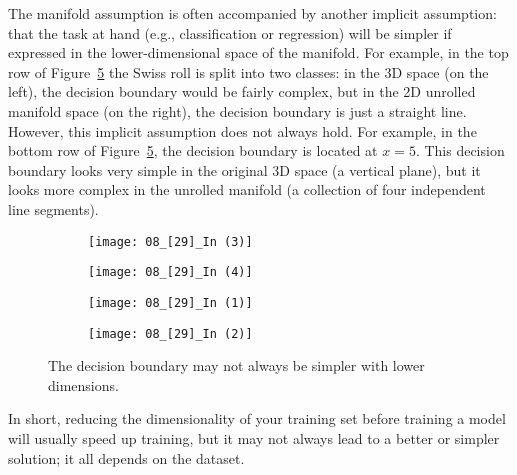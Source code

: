 The manifold assumption is often accompanied by another implicit assumption: that the task at hand (e.g., classification or regression) will be simpler if expressed in the lower-dimensional space of the manifold. For example, in the top row of Figure~\ref{08_[29]_In} the Swiss roll is split into two classes: in the 3D space (on the left), the decision boundary would be fairly complex, but in the 2D unrolled manifold space (on the right), the decision boundary is just a straight line. However, this implicit assumption does not always hold. For example, in the bottom row of Figure~\ref{08_[29]_In}, the decision boundary is located at $x=5$. This decision boundary looks very simple in the original 3D space (a vertical plane), but it looks more complex in the unrolled manifold (a collection of four independent line segments).
\begin{figure}[h!t]
\centering
\begin{subfigure}[ht]{0.495\textwidth}
	\centering
	\texttt{[image: 08\_[29]\_In (3)]}
	\caption{}\label{08_[29]_In(3)}
\end{subfigure}
\hfill
\begin{subfigure}[ht]{0.475\textwidth}
	\centering
	\texttt{[image: 08\_[29]\_In (4)]}
        \caption{}\label{08_[29]_In(4)}
\end{subfigure}

\vspace{\baselineskip}\noindent
\begin{subfigure}[ht]{0.495\textwidth}
	\centering
	\texttt{[image: 08\_[29]\_In (1)]}
	\caption{}\label{08_[29]_In(1)}
\end{subfigure}
\hfill
\begin{subfigure}[ht]{0.475\textwidth}
	\centering
	\texttt{[image: 08\_[29]\_In (2)]}
        \caption{}\label{08_[29]_In(2)}
\end{subfigure}
\caption{The decision boundary may not always be simpler with lower dimensions.}\label{08_[29]_In}
\end{figure}

In short, reducing the dimensionality of your training set before training a model will usually speed up training, but it may not always lead to a better or simpler solution; it all depends on the dataset.

